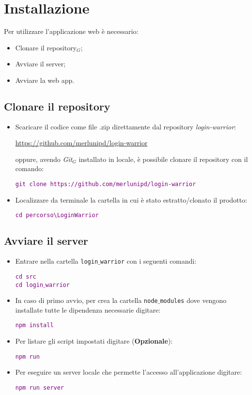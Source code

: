 \chapter{Installazione}
Per utilizzare l'applicazione web è necessario:
\begin{itemize}
  \item Clonare il repository$_G$;
  \item Avviare il server;
  \item Avviare la web app.
\end{itemize}
\section{Clonare il repository}
\begin{itemize}
  \item Scaricare il codice come file .zip direttamente dal repository \textit{login-warrior}:
  \begin{center}
    \url{https://github.com/merlunipd/login-warrior}
  \end{center}
  oppure, avendo \textit{Git}$_G$ installato in locale, è possibile clonare il repository con il comando:
  \begin{center}
    \textcolor{purple}{\texttt{git clone https://github.com/merlunipd/login-warrior}}
  \end{center}
  \item Localizzare da terminale la cartella in cui è stato estratto/clonato il prodotto:
  \begin{center}
    \textcolor{purple}{\texttt{cd percorso\textbackslash LoginWarrior}}
  \end{center}
\end{itemize}

\section{Avviare il server}
\begin{itemize}
  \item Entrare nella cartella \texttt{login$\_$warrior} con i seguenti comandi:
  \begin{center}
    \textcolor{purple}{\texttt{cd src} \\
    \texttt{cd login$\_$warrior}}
  \end{center}
  \item In caso di primo avvio, per crea la cartella \texttt{node$\_$modules} dove vengono installate tutte le dipendenza necessarie digitare:
  \begin{center}
    \textcolor{purple}{\texttt{npm install}}
  \end{center}
  \item Per listare gli script impostati digitare (\textbf{Opzionale}):
  \begin{center}
    \textcolor{purple}{\texttt{npm run}}
  \end{center}
  \item Per eseguire un server locale che permette l'accesso all'applicazione digitare:
  \begin{center}
    \textcolor{purple}{\texttt{npm run server}}
  \end{center}
\end{itemize}

